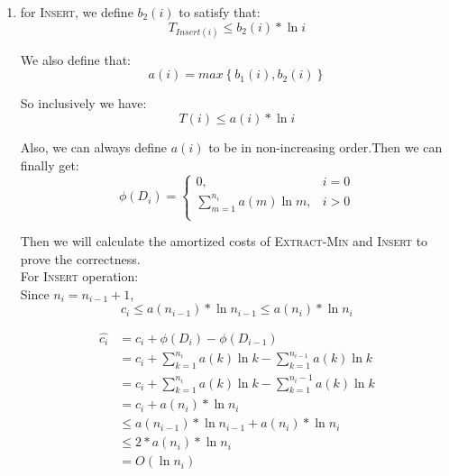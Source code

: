 \documentclass[12pt,a4paper]{article}
\makeatletter
\newtheorem*{solution}{Solution}
\theoremstyle{definition}
\renewenvironment{solution}[1][Solution] {\par\pushQED{\qed}\normalfont\topsep6\p@\@plus6\p@\relax\trivlist\item[\hskip\labelsep\bfseries#1\@addpunct{.}]\ignorespaces}{\popQED\endtrivlist\@endpefalse} \makeatother
\makeatother
\begin{document}
\begin{enumerate}
\begin{solution}
	for \textsc{Insert}, we define $b_2\left(i\right)$ to satisfy that:\\
	\begin{equation}
	T_{Insert \left(i\right) } \leq b_2\left(i\right) * \ln i 
	\end{equation}
	
	We also define that:\\
	\begin{equation}
	a\left(i\right)=max \left\{ b_1\left(i\right),b_2\left(i\right) \right\}
	\end{equation}
	
	So inclusively we have:\\
	\begin{equation}
	T \left(i\right) \leq a\left(i\right) * \ln i 
	\end{equation}
	
	Also, we can always define $a\left(i\right)$ to be in non-increasing order.Then we can finally get:\\
	\begin{equation}
	    \phi \left(D_i\right)=
	    \begin{cases}
	    0, & i=0 \\
	    \sum_{m=1}^{n_i} a\left(m\right) \ln m, & i>0 \\    
	    \end{cases}
	    
	\end{equation}
	
	Then we will calculate the amortized costs of \textsc{Extract-Min} and \textsc{Insert} to prove the correctness. \\
	For \textsc{Insert} operation:\\
	Since $n_i = n_{i-1}+1$, 
	\begin{equation}
	    c_i \leq a\left(n_{i-1}\right) * \ln n_{i-1} \leq a\left(n_i\right) * \ln n_i
	\end{equation}
	
	\begin{equation}
	\begin{aligned}
	    \hat{c_i} &= c_i + \phi \left(D_i\right) - \phi \left(D_{i-1}\right) \\
	       &= c_i+\sum_{k=1}^{n_i} a\left(k\right) \ln k - \sum_{k=1}^{n_{i-1}} a\left(k\right) \ln k \\
	       &=c_i+\sum_{k=1}^{n_i} a\left(k\right) \ln k - \sum_{k=1}^{n_{i}-1} a\left(k\right) \ln k \\
	       &=c_i + a\left(n_i\right) * \ln n_i \\
	       &\leq a\left(n_{i-1}\right) * \ln n_{i-1} +a\left(n_i\right) * \ln n_i \\
	       &\leq 2*a\left(n_i\right) * \ln n_i \\
	       &=O\left(\ln n_i \right) \\
	\end{aligned}
	\end{equation}
	

\end{solution}
\end{enumerate}
\end{document}

